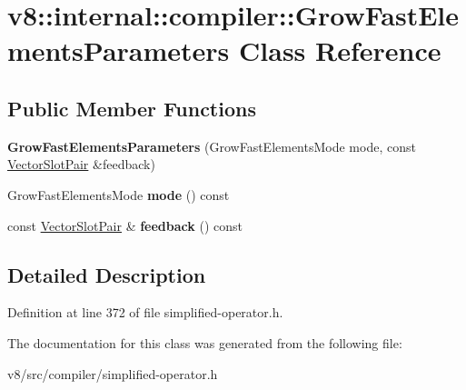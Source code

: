 \hypertarget{classv8_1_1internal_1_1compiler_1_1GrowFastElementsParameters}{}\section{v8\+:\+:internal\+:\+:compiler\+:\+:Grow\+Fast\+Elements\+Parameters Class Reference}
\label{classv8_1_1internal_1_1compiler_1_1GrowFastElementsParameters}
\subsection*{Public Member Functions}
\begin{DoxyCompactItemize}
\item 
\mbox{\label{classv8_1_1internal_1_1compiler_1_1GrowFastElementsParameters_a8156b746e806f631288a5f322f80708b}} 
{\bfseries Grow\+Fast\+Elements\+Parameters} (Grow\+Fast\+Elements\+Mode mode, const \mbox{\hyperlink{classv8_1_1internal_1_1VectorSlotPair}{Vector\+Slot\+Pair}} \&feedback)
\item 
\mbox{\label{classv8_1_1internal_1_1compiler_1_1GrowFastElementsParameters_a1f90ee384f927c7aa4a9b07b7659ea81}} 
Grow\+Fast\+Elements\+Mode {\bfseries mode} () const
\item 
\mbox{\label{classv8_1_1internal_1_1compiler_1_1GrowFastElementsParameters_a7cd9ad1c5a1a70107a659203c7df74a7}} 
const \mbox{\hyperlink{classv8_1_1internal_1_1VectorSlotPair}{Vector\+Slot\+Pair}} \& {\bfseries feedback} () const
\end{DoxyCompactItemize}


\subsection{Detailed Description}


Definition at line 372 of file simplified-\/operator.\+h.



The documentation for this class was generated from the following file\+:\begin{DoxyCompactItemize}
\item 
v8/src/compiler/simplified-\/operator.\+h\end{DoxyCompactItemize}
